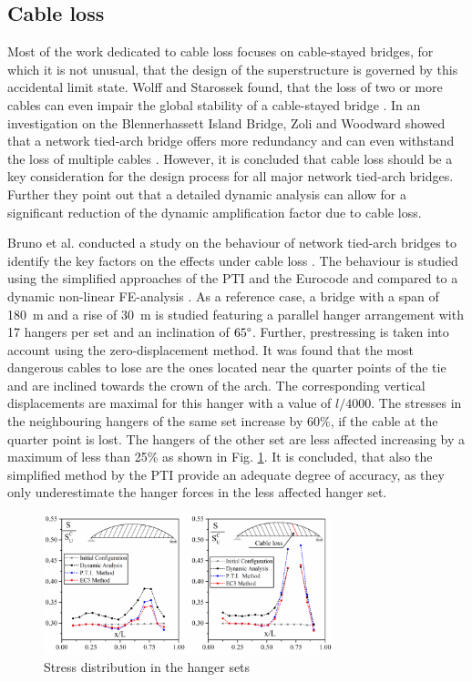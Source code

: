 \subsection{Cable loss} \label{sec:rev_loss}

Most of the work dedicated to cable loss focuses on cable-stayed bridges, for which it is not unusual, that the design of the superstructure is governed by this accidental limit state. Wolff and Starossek found, that the loss of two or more cables can even impair the global stability of a cable-stayed bridge \cite{Wolff}. In an investigation on the Blennerhassett Island Bridge, Zoli and Woodward showed that a network tied-arch bridge offers more redundancy and can even withstand the loss of multiple cables \cite{Zoli}. However, it is concluded that cable loss should be a key consideration for the design process for all major network tied-arch bridges. Further they point out that a detailed dynamic analysis can allow for a significant reduction of the dynamic amplification factor due to cable loss.\bigskip

Bruno et al. conducted a study on the behaviour of network tied-arch bridges to identify the key factors on the effects under cable loss \cite{Bruno}. The behaviour is studied using the simplified approaches of the PTI and the Eurocode and compared to a dynamic non-linear FE-analysis \cite{PTI}. As a reference case, a bridge with a span of \SI{180}{m} and a rise of \SI{30}{m} is studied featuring a parallel hanger arrangement with 17 hangers per set and an inclination of $65 \degree$. Further, prestressing is taken into account using the zero-displacement method. It was found that the most dangerous cables to lose are the ones located near the quarter points of the tie and are inclined towards the crown of the arch. The corresponding vertical displacements are maximal for this hanger with a value of $l/4000$. The stresses in the neighbouring hangers of the same set increase by 60\%, if the cable at the quarter point is lost. The hangers of the other set are less affected increasing by a maximum of less than 25\% as shown in Fig. \ref{fig:Bruno}. It is concluded, that also the simplified method by the PTI provide an adequate degree of accuracy, as they only underestimate the hanger forces in the less affected hanger set.
\begin{figure}[H]
    \centering
    \includegraphics[width=0.75\textwidth]{Pictures/BrunoCableLoss.PNG}
    \caption{Stress distribution in the hanger sets \citep{Bruno}}
    \label{fig:Bruno}
\end{figure}

